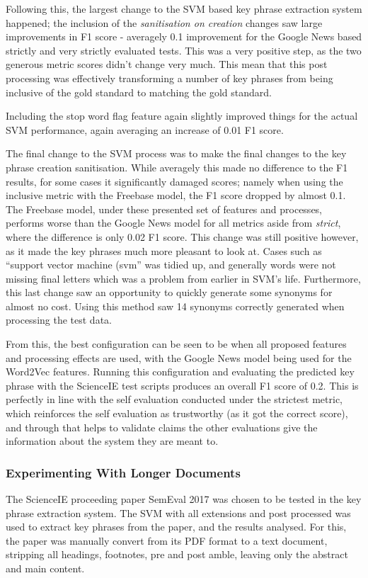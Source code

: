 Following this, the largest change to the SVM based key phrase extraction system happened; the inclusion of the \textit{sanitisation on creation} changes saw large improvements in F1 score - averagely 0.1 improvement for the Google News based strictly and very strictly evaluated tests. This was a very positive step, as the two generous metric scores didn't change very much. This mean that this post processing was effectively transforming a number of key phrases from being inclusive of the gold standard to matching the gold standard. 

Including the stop word flag feature again slightly improved things for the actual SVM performance, again averaging an increase of 0.01 F1 score.

The final change to the SVM process was to make the final changes to the key phrase creation sanitisation. While averagely this made no difference to the F1 results, for some cases it significantly damaged scores; namely when using the inclusive metric with the Freebase model, the F1 score dropped by almost 0.1. The Freebase model, under these presented set of features and processes, performs worse than the Google News model for all metrics aside from \textit{strict}, where the difference is only 0.02 F1 score. This change was still positive however, as it made the key phrases much more pleasant to look at. Cases such as ``support vector machine (svm'' was tidied up, and generally words were not missing final letters which was a problem from earlier in SVM's life. Furthermore, this last change saw an opportunity to quickly generate some synonyms for almost no cost. Using this method saw 14 synonyms correctly generated when processing the test data. 

From this, the best configuration can be seen to be when all proposed features and processing effects are used, with the Google News model being used for the Word2Vec features. Running this configuration and evaluating the predicted key phrase with the ScienceIE test scripts produces an overall F1 score of 0.2. This is perfectly in line with the self evaluation conducted under the strictest metric, which reinforces the self evaluation as trustworthy (as it got the correct score), and through that helps to validate claims the other evaluations give the information about the system they are meant to. 

\subsubsection{Experimenting With Longer Documents}
The ScienceIE proceeding paper SemEval 2017 \cite{Augenstein2017} was chosen to be tested in the key phrase extraction system. The SVM with all extensions and post processed was used to extract key phrases from the paper, and the results analysed. For this, the paper was manually convert from its PDF format to a text document, stripping all headings, footnotes, pre and post amble, leaving only the abstract and main content.

